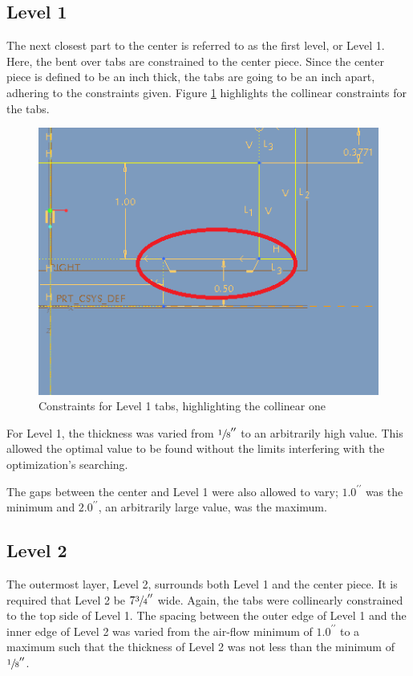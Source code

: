 \documentclass[12pt,letterpaper]{report}
\newcommand{\inchsign}{^{\prime\prime}} %
\begin{document}
		\subsection{Level 1}
		The next closest part to the center is referred to as the first level, or Level 1.  Here, the bent over tabs are constrained to the center piece.  Since the center piece is defined to be an inch thick, the tabs are going to be an inch apart, adhering to the constraints given.  Figure \ref{fig:L1Constraints} highlights the collinear constraints for the tabs.
		
		\graphicspath{ {./ScreenShots/} }
		\begin{figure}[h]
			\centering
			\includegraphics[width=.75\textwidth]{L1Constraints}
			\caption{Constraints for Level 1 tabs, highlighting the collinear one}
			\label{fig:L1Constraints}
		\end{figure}
		\graphicspath{ {..} }
		
		For Level 1, the thickness was varied from $\sfrac{1}{8}\inchsign$ to an arbitrarily high value.  This allowed the optimal value to be found without the limits interfering with the optimization's searching.
		
		The gaps between the center and Level 1 were also allowed to vary; $1.0\inchsign$ was the minimum and $2.0\inchsign$, an arbitrarily large value, was the maximum.
		
		\subsection{Level 2}
		The outermost layer, Level 2, surrounds both Level 1 and the center piece.  It is required that Level 2 be $7\sfrac{3}{4}\inchsign$ wide.  Again, the tabs were collinearly constrained to the top side of Level 1.  The spacing between the outer edge of Level 1 and the inner edge of Level 2 was varied from the air-flow minimum of $1.0\inchsign$ to a maximum such that the thickness of Level 2 was not less than the minimum of $\sfrac{1}{8}\inchsign$.
		
\end{document}
